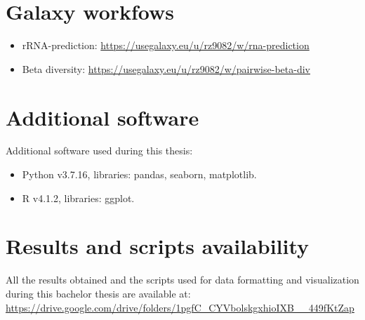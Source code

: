 \section{Galaxy workfows}\label{appendix_galaxy_workflows}
\begin{itemize}
    \item rRNA-prediction: \url{https://usegalaxy.eu/u/rz9082/w/rna-prediction}\\
    \item Beta diversity: \url{https://usegalaxy.eu/u/rz9082/w/pairwise-beta-div}
\end{itemize}
\section{Additional software}\label{used_software}
Additional software used during this thesis:
\begin{itemize}
    \item Python v3.7.16, libraries: pandas, seaborn, matplotlib.
    \item R v4.1.2, libraries: ggplot.
\end{itemize}
\section{Results and scripts availability}\label{appendix_results}
All the results obtained and the scripts used for data formatting and visualization during this bachelor thesis are available at: \url{https://drive.google.com/drive/folders/1pgfC_CYVbolskgxhioIXB__449fKtZap}
